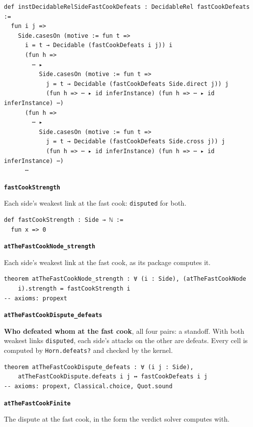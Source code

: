 \documentclass[11pt]{article}
\begin{document}
{\small\begin{verbatim}
def instDecidableRelSideFastCookDefeats : DecidableRel fastCookDefeats :=
  fun i j =>
    Side.casesOn (motive := fun t =>
      i = t → Decidable (fastCookDefeats i j)) i
      (fun h =>
        ⋯ ▸
          Side.casesOn (motive := fun t =>
            j = t → Decidable (fastCookDefeats Side.direct j)) j
            (fun h => ⋯ ▸ id inferInstance) (fun h => ⋯ ▸ id inferInstance) ⋯)
      (fun h =>
        ⋯ ▸
          Side.casesOn (motive := fun t =>
            j = t → Decidable (fastCookDefeats Side.cross j)) j
            (fun h => ⋯ ▸ id inferInstance) (fun h => ⋯ ▸ id inferInstance) ⋯)
      ⋯
\end{verbatim}}
\par\medskip\noindent\textbf{\texttt{fast\allowbreak{}Cook\allowbreak{}Strength}}\par\nobreak\noindent
Each side’s weakest link at the fast cook: \texttt{disputed} for both.

{\small\begin{verbatim}
def fastCookStrength : Side → ℕ :=
  fun x => 0
\end{verbatim}}
\par\medskip\noindent\textbf{\texttt{at\allowbreak{}The\allowbreak{}Fast\allowbreak{}Cook\allowbreak{}Node\_\allowbreak{}strength}}\par\nobreak\noindent
Each side’s weakest link at the fast cook, as its package computes it.

{\small\begin{verbatim}
theorem atTheFastCookNode_strength : ∀ (i : Side), (atTheFastCookNode
    i).strength = fastCookStrength i
-- axioms: propext
\end{verbatim}}
\par\medskip\noindent\textbf{\texttt{at\allowbreak{}The\allowbreak{}Fast\allowbreak{}Cook\allowbreak{}Dispute\_\allowbreak{}defeats}}\par\nobreak\noindent
\textbf{Who defeated whom at the fast cook}, all four pairs: a standoff. With both weakest links \texttt{disputed}, each side’s attacks on the other are defeats. Every cell is computed by \texttt{Horn.defeats?} and checked by the kernel.

{\small\begin{verbatim}
theorem atTheFastCookDispute_defeats : ∀ (i j : Side),
    atTheFastCookDispute.defeats i j ↔ fastCookDefeats i j
-- axioms: propext, Classical.choice, Quot.sound
\end{verbatim}}
\par\medskip\noindent\textbf{\texttt{at\allowbreak{}The\allowbreak{}Fast\allowbreak{}Cook\allowbreak{}Finite}}\par\nobreak\noindent
The dispute at the fast cook, in the form the verdict solver computes with.
\end{document}
